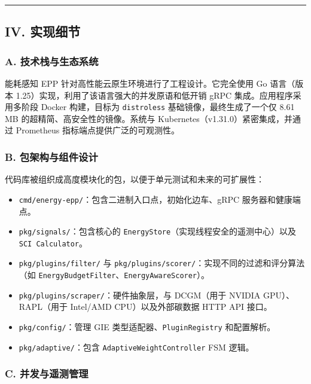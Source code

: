 \begin{center}\rule{0.5\linewidth}{0.5pt}\end{center}

\subsection{IV. 实现细节}\label{iv.-implementation-details}

\subsubsection{A. 技术栈与生态系统}\label{a.-technology-stack-and-ecosystem}

能耗感知 EPP 针对高性能云原生环境进行了工程设计。它完全使用 Go 语言（版本 1.25）实现，利用了该语言强大的并发原语和低开销 gRPC 集成。应用程序采用多阶段 Docker 构建，目标为 \texttt{distroless} 基础镜像，最终生成了一个仅 8.61 MB 的超精简、高安全性的镜像。系统与 Kubernetes（v1.31.0）紧密集成，并通过 Prometheus 指标端点提供广泛的可观测性。

\subsubsection{B. 包架构与组件设计}\label{b.-package-architecture-and-component-design}

代码库被组织成高度模块化的包，以便于单元测试和未来的可扩展性：
\begin{itemize}
    \item \texttt{cmd/energy-epp/}：包含二进制入口点，初始化边车、gRPC 服务器和健康端点。
    \item \texttt{pkg/signals/}：包含核心的 \texttt{EnergyStore}（实现线程安全的遥测中心）以及 \texttt{SCI Calculator}。
    \item \texttt{pkg/plugins/filter/} 与 \texttt{pkg/plugins/scorer/}：实现不同的过滤和评分算法（如 \texttt{EnergyBudgetFilter}、\texttt{EnergyAwareScorer}）。
    \item \texttt{pkg/plugins/scraper/}：硬件抽象层，与 DCGM（用于 NVIDIA GPU）、RAPL（用于 Intel/AMD CPU）以及外部碳数据 HTTP API 接口。
    \item \texttt{pkg/config/}：管理 GIE 类型适配器、\texttt{PluginRegistry} 和配置解析。
    \item \texttt{pkg/adaptive/}：包含 \texttt{AdaptiveWeightController} FSM 逻辑。
\end{itemize}

\subsubsection{C. 并发与遥测管理}\label{c.-concurrency-and-telemetry-management}

